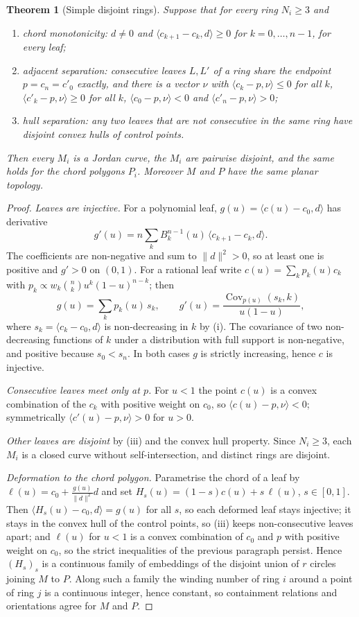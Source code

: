 \documentclass[11pt,a4paper]{article}
\newtheorem{theorem}{Theorem}
\theoremstyle{definition}
\theoremstyle{remark}
\newcommand{\ip}[2]{\langle #1,#2\rangle}
\begin{document}
\begin{theorem}[Simple disjoint rings]\label{thm:jordan}
Suppose that for every ring $N_i\ge3$ and
\begin{enumerate}
\item[(i)] \emph{chord monotonicity}: $d\ne0$ and
  $\ip{c_{k+1}-c_k}{d}\ge0$ for $k=0,\dots,n-1$, for every leaf;
\item[(ii)] \emph{adjacent separation}: consecutive leaves $L,L'$ of a ring
  share the endpoint $p=c_n=c'_0$ exactly, and there is a vector $\nu$ with
  $\ip{c_k-p}{\nu}\le0$ for all $k$, $\ip{c'_k-p}{\nu}\ge0$ for all $k$,
  $\ip{c_0-p}{\nu}<0$ and $\ip{c'_n-p}{\nu}>0$;
\item[(iii)] \emph{hull separation}: any two leaves that are not consecutive in
  the same ring have disjoint convex hulls of control points.
\end{enumerate}
Then every $M_i$ is a Jordan curve, the $M_i$ are pairwise disjoint, and the
same holds for the chord polygons $P_i$. Moreover $M$ and $P$ have the same
planar topology.
\end{theorem}
\begin{proof}
\emph{Leaves are injective.} For a polynomial leaf,
$g(u)=\ip{c(u)-c_0}{d}$ has derivative
\[
  g'(u)=n\sum_kB^{n-1}_k(u)\,\ip{c_{k+1}-c_k}{d}.
\]
The coefficients are non-negative and
sum to $\lVert d\rVert^2>0$, so at least one is positive and $g'>0$ on $(0,1)$.
For a rational leaf write $c(u)=\sum_kp_k(u)c_k$ with
$p_k\propto w_k\binom nku^k(1-u)^{n-k}$; then
\[
  g(u)=\sum_kp_k(u)\,s_k,\qquad
  g'(u)=\frac{\operatorname{Cov}_{p(u)}(s_k,k)}{u(1-u)},
\]
where $s_k=\ip{c_k-c_0}{d}$ is non-decreasing in $k$ by (i). The covariance of two
non-decreasing functions of $k$ under a distribution with full support is
non-negative, and positive because $s_0<s_n$. In both cases $g$ is strictly
increasing, hence $c$ is injective.

\emph{Consecutive leaves meet only at $p$.} For $u<1$ the point $c(u)$ is a
convex combination of the $c_k$ with positive weight on $c_0$, so
$\ip{c(u)-p}{\nu}<0$; symmetrically $\ip{c'(u)-p}{\nu}>0$ for $u>0$.

\emph{Other leaves are disjoint} by (iii) and the convex hull property. Since
$N_i\ge3$, each $M_i$ is a closed curve without self-intersection, and distinct
rings are disjoint.

\emph{Deformation to the chord polygon.} Parametrise the chord of a leaf by
$\ell(u)=c_0+\frac{g(u)}{\lVert d\rVert^2}d$ and set
$H_s(u)=(1-s)c(u)+s\,\ell(u)$, $s\in[0,1]$. Then
$\ip{H_s(u)-c_0}{d}=g(u)$ for all $s$, so each deformed leaf stays injective; it
stays in the convex hull of the control points, so (iii) keeps non-consecutive
leaves apart; and $\ell(u)$ for $u<1$ is a convex combination of $c_0$ and $p$
with positive weight on $c_0$, so the strict inequalities of the previous
paragraph persist. Hence $(H_s)_s$ is a continuous family of embeddings of the
disjoint union of $r$ circles joining $M$ to $P$. Along such a family the
winding number of ring $i$ around a point of ring $j$ is a continuous integer,
hence constant, so containment relations and orientations agree for $M$ and
$P$.
\end{proof}
\end{document}
